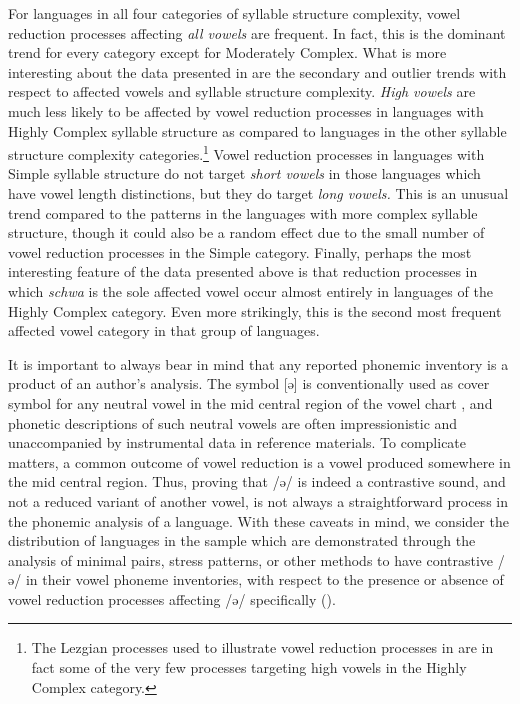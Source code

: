   For languages in all four categories of syllable structure complexity, vowel reduction processes affecting \textit{all vowels} are frequent. In fact, this is the dominant trend for every category except for Moderately Complex. What is more interesting about the data presented in  are the secondary and outlier trends with respect to affected vowels and syllable structure complexity. \textit{High vowels} are much less likely to be affected by vowel reduction processes in languages with Highly Complex syllable structure as compared to languages in the other syllable structure complexity categories.\footnote{{The Lezgian processes used to illustrate vowel reduction processes in  are in fact some of the very few processes targeting high vowels in the Highly Complex category.}} Vowel reduction processes in languages with Simple syllable structure do not target \textit{short vowels} in those languages which have vowel length distinctions, but they do target \textit{long vowels.} This is an unusual trend compared to the patterns in the languages with more complex syllable structure, though it could also be a random effect due to the small number of vowel reduction processes in the Simple category. Finally, perhaps the most interesting feature of the data presented above is that reduction processes in which \textit{schwa} is the sole affected vowel occur almost entirely in languages of the Highly Complex category. Even more strikingly, this is the second most frequent affected vowel category in that group of languages.

  It is important to always bear in mind that any reported phonemic inventory is a product of an author’s analysis. The symbol [ə] is conventionally used as cover symbol for any neutral vowel in the mid central region of the vowel chart \citep[280]{Laver1994}, and phonetic descriptions of such neutral vowels are often impressionistic and unaccompanied by instrumental data in reference materials. To complicate matters, a common outcome of vowel reduction is a vowel produced somewhere in the mid central region. Thus, proving that /ə/ is indeed a contrastive sound, and not a reduced variant of another vowel, is not always a straightforward process in the phonemic analysis of a language. With these caveats in mind, we consider the distribution of languages in the sample which are demonstrated through the analysis of minimal pairs, stress patterns, or other methods to have contrastive /ə/ in their vowel phoneme inventories, with respect to the presence or absence of vowel reduction processes affecting /ə/ specifically ().

